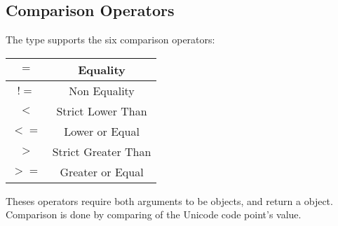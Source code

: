 \subsection{Comparison Operators}

The  type supports the six comparison operators:\newline

\begin{tabular}{|c|c|}
\hline
$=$ & Equality \\
\hline
$!=$ & Non Equality \\
\hline
$<$  & Strict Lower Than \\
\hline
$<=$  & Lower or Equal \\
\hline
$>$  & Strict Greater Than \\
\hline
$>=$  & Greater or Equal \\
\hline
\end{tabular}

Theses operators require both arguments to be  objects, and return a  object. Comparison is done by comparing of the Unicode code point's value.


